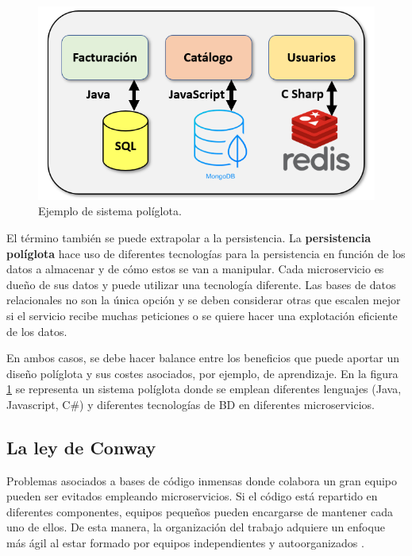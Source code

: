 \documentclass[11pt,spanish,listoffigures]{tfgetsinf}
\begin{document}
\begin{figure}[h]
\centering
\includegraphics[scale=0.65]{poliglota}
\caption{Ejemplo de sistema políglota.}
\label{fig:poliglota}
\end{figure}

El término también se puede extrapolar a la persistencia. La \textbf{persistencia políglota} \cite{Fowler2011} hace uso de diferentes tecnologías para la persistencia en función de los datos a almacenar y de cómo estos se van a manipular. Cada microservicio es dueño de sus datos y puede utilizar una tecnología diferente. Las bases de datos relacionales no son la única opción y se deben considerar otras que escalen mejor si el servicio recibe muchas peticiones o se quiere hacer una explotación eficiente de los datos.

En ambos casos, se debe hacer balance entre los beneficios que puede aportar un diseño políglota y sus costes asociados, por ejemplo, de aprendizaje. En la figura \ref{fig:poliglota} se representa un sistema políglota donde se emplean diferentes lenguajes (Java, Javascript, C\#) y diferentes tecnologías de BD en diferentes microservicios.

\subsection{La ley de Conway \cite{Conway1968}}

Problemas asociados a bases de código inmensas donde colabora un gran equipo pueden ser evitados empleando microservicios. Si el código está repartido en diferentes componentes, equipos pequeños pueden encargarse de mantener cada uno de ellos. De esta manera, la organización del trabajo adquiere un enfoque más ágil al estar formado por equipos independientes y autoorganizados \cite{Newman2015a}.
\end{document}
